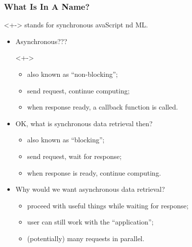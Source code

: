 \documentclass[svgnames]{beamer}
\begin{document}
\begin{frame} 
\frametitle{What Is In A Name?}

\begin{uncoverenv}<+->
   stands for synchronous avaScript
  nd ML.
\end{uncoverenv}

\begin{itemize}
\item<+-> Asynchronous??? 
  \begin{uncoverenv}<+->
    \begin{itemize}
    \item also known as ``non-blocking'';
    \item send request, continue computing;
    \item when response ready, a callback function is called.
    \end{itemize}
  \end{uncoverenv}
\item<+-> OK, what is synchronous data retrieval then?
\begin{itemize}
\item also known as ``blocking'';
\item send request, wait for response;
\item when response is ready, continue computing.
\end{itemize}

\item<+-> Why would we want asynchronous data retrieval?
\begin{itemize}
\item proceed with useful things while waiting for response;
\item user can still work with the ``application'';
\item (potentially) many requests in parallel.
\end{itemize}
\end{itemize}
  
\end{frame}
\end{document}
